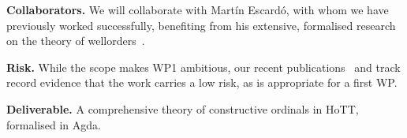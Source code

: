 \documentclass[a4paper,11pt]{article}
\let\oldcite\cite
\renewcommand*\cite[1]{{\protect\NoHyper\oldcite{#1}\protect\endNoHyper}}
\renewcommand{\paragraph}[1]{\textbf{#1.}}
\begin{document}


\paragraph{Collaborators}
We will collaborate with Mart\'in Escard\'o, with whom we have previously worked successfully, benefiting from his extensive, formalised research on the theory of wellorders~\cite{TypeTopologyOrdinals}. %

\paragraph{Risk}
While the scope makes WP1 ambitious, our recent publications~\cite{NordvallForsbergXu2020ord,KrausNordvallForsbergXu2021ordHoTT,ordTCS,dejong-kra-nf-xu:set-type-ordinals} and track record evidence that the work carries a low risk, as is appropriate for a first WP.%




\paragraph{Deliverable} 
A comprehensive 
theory of constructive ordinals in HoTT, formalised in Agda.
\end{document}
